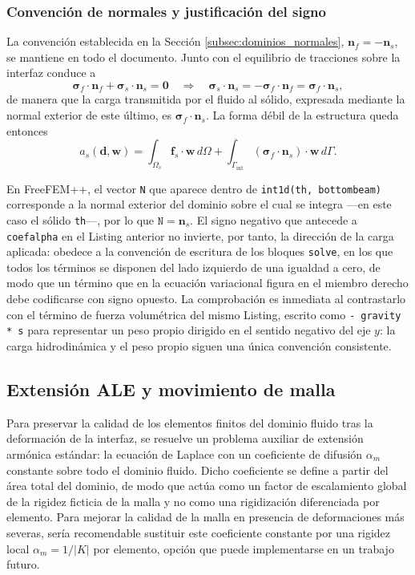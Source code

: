 \documentclass[12pt, letterpaper]{report}
\theoremstyle{definition}
\begin{document}
\subsubsection*{Convención de normales y justificación del signo}

La convención establecida en la Sección \ref{subsec:dominios_normales}, $\mathbf{n}_f = -\mathbf{n}_s$, se mantiene en todo el documento. Junto con el equilibrio de tracciones sobre la interfaz conduce a
\begin{equation} \label{eq:equilibrio_signo}
    \boldsymbol{\sigma}_f \cdot \mathbf{n}_f + \boldsymbol{\sigma}_s \cdot \mathbf{n}_s = \mathbf{0}
    \quad \Longrightarrow \quad
    \boldsymbol{\sigma}_s \cdot \mathbf{n}_s = -\boldsymbol{\sigma}_f \cdot \mathbf{n}_f = \boldsymbol{\sigma}_f \cdot \mathbf{n}_s ,
\end{equation}
de manera que la carga transmitida por el fluido al sólido, expresada mediante la normal exterior de este último, es $\boldsymbol{\sigma}_f \cdot \mathbf{n}_s$. La forma débil de la estructura queda entonces
\[
    a_s(\mathbf{d}, \mathbf{w}) = \int_{\Omega_s} \mathbf{f}_s \cdot \mathbf{w} \, d\Omega
    + \int_{\Gamma_{\text{int}}} \left( \boldsymbol{\sigma}_f \cdot \mathbf{n}_s \right) \cdot \mathbf{w} \, d\Gamma .
\]

En FreeFEM++, el vector \texttt{N} que aparece dentro de \texttt{int1d(th, bottombeam)} corresponde a la normal exterior del dominio sobre el cual se integra ---en este caso el sólido \texttt{th}---, por lo que $\texttt{N} = \mathbf{n}_s$. El signo negativo que antecede a \texttt{coefalpha} en el Listing anterior no invierte, por tanto, la dirección de la carga aplicada: obedece a la convención de escritura de los bloques \texttt{solve}, en los que todos los términos se disponen del lado izquierdo de una igualdad a cero, de modo que un término que en la ecuación variacional figura en el miembro derecho debe codificarse con signo opuesto. La comprobación es inmediata al contrastarlo con el término de fuerza volumétrica del mismo Listing, escrito como \texttt{- gravity * s} para representar un peso propio dirigido en el sentido negativo del eje $y$: la carga hidrodinámica y el peso propio siguen una única convención consistente.

\subsection{Extensión ALE y movimiento de malla}

Para preservar la calidad de los elementos finitos del dominio fluido tras la deformación de la interfaz, se resuelve un problema auxiliar de extensión armónica estándar: la ecuación de Laplace con un coeficiente de difusión $\alpha_m$ constante sobre todo el dominio fluido. Dicho coeficiente se define a partir del área total del dominio, de modo que actúa como un factor de escalamiento global de la rigidez ficticia de la malla y no como una rigidización diferenciada por elemento.  Para mejorar la calidad de la malla en presencia de deformaciones más severas, sería recomendable sustituir este coeficiente constante por una rigidez local 
$\alpha_m = 1/|K|$ por elemento, opción que puede implementarse en un trabajo futuro.
\end{document}
